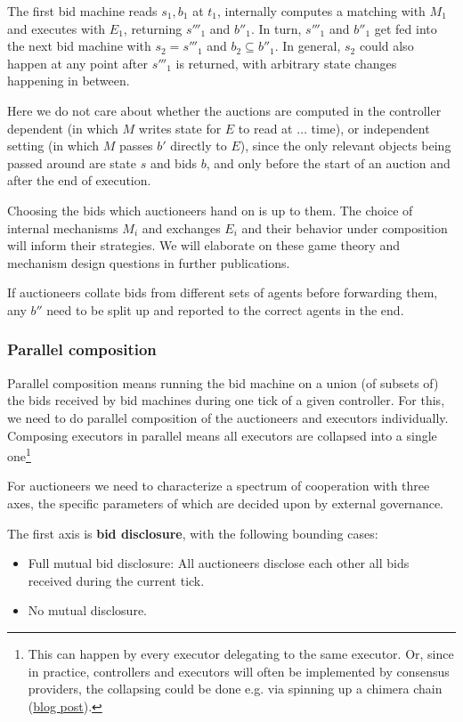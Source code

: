 The first bid machine reads $s_1, b_1$ at $t_1$, internally computes a matching with $M_1$ and executes with $E_1$, returning $s'''_1$ and $b''_1$. In turn, $s'''_1$ and $b''_1$ get fed into the next bid machine with $s_2 = s'''_1$ and $b_2 \subseteq b''_1$. In general, $s_2$ could also happen at any point after $s'''_1$ is returned, with arbitrary state changes happening in between.

Here we do not care about whether the auctions are computed in the controller dependent (in which $M$ writes state for $E$ to read at $\dots$ time), or independent setting (in which $M$ passes $b'$ directly to $E$), since the only relevant objects being passed around are state $s$ and bids $b$, and only before the start of an auction and after the end of execution. 

Choosing the bids which auctioneers hand on is up to them. The choice of internal mechanisms $M_i$ and exchanges $E_i$ and their behavior under composition will inform their strategies. We will elaborate on these game theory and mechanism design questions in further publications.

If auctioneers collate bids from different sets of agents before forwarding them, any $b''$ need to be split up and reported to the correct agents in the end.


\subsubsection{Parallel composition}
Parallel composition means running the bid machine on a union (of subsets of) the bids received by bid machines during one tick of a given controller. For this, we need to do parallel composition of the auctioneers and executors individually. Composing executors in parallel means all executors are collapsed into a single one\footnote{This can happen by every executor delegating to the same executor. Or, since in practice, controllers and executors will often be implemented by consensus providers, the collapsing could be done e.g. via spinning up a chimera chain (\href{https://anoma.net/blog/chimera-chains}{blog post}).}

For auctioneers we need to characterize a spectrum of cooperation with three axes, the specific parameters of which are decided upon by external governance.

The first axis is \textbf{bid disclosure}, with the following bounding cases:
\begin{itemize}
    \item Full mutual bid disclosure: All auctioneers disclose each other all bids received during the current tick.
    \item No mutual disclosure.
\end{itemize}

